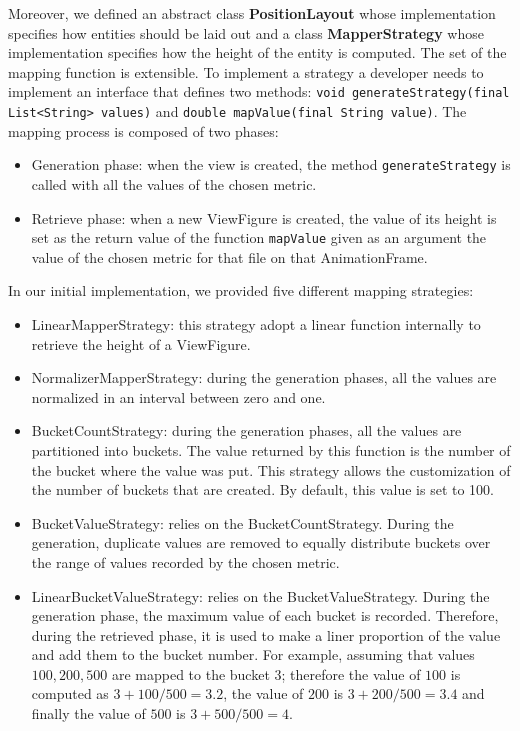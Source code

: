 Moreover, we defined an abstract class \textbf{PositionLayout} whose implementation specifies how entities should be laid out and a class \textbf{MapperStrategy} whose implementation specifies how the height of the entity is computed. The set of the mapping function is extensible. To implement a strategy a developer needs to implement an interface that defines two methods: \texttt{void generateStrategy(final List<String> values)} and \texttt{double mapValue(final String value)}. The mapping process is composed of two phases:
\begin{itemize}
    \item Generation phase: when the view is created, the method \texttt{generateStrategy} is called with all the values of the chosen metric. 
    \item Retrieve phase: when a new ViewFigure is created, the value of its height is set as the return value of the function \texttt{mapValue} given as an argument the value of the chosen metric for that file on that AnimationFrame. 
\end{itemize}

In our initial implementation, we provided five different mapping strategies:
\begin{itemize}
    \item LinearMapperStrategy: this strategy adopt a linear function internally to retrieve the height of a ViewFigure. 
    \item NormalizerMapperStrategy: during the generation phases, all the values are normalized in an interval between zero and one.

    \item BucketCountStrategy: during the generation phases, all the values are partitioned into buckets. The value returned by this function is the number of the bucket where the value was put. This strategy allows the customization of the number of buckets that are created. By default, this value is set to 100. 
    \item BucketValueStrategy: relies on the BucketCountStrategy. During the generation, duplicate values are removed to equally distribute buckets over the range of values recorded by the chosen metric. 

    \item LinearBucketValueStrategy: relies on the BucketValueStrategy. During the generation phase, the maximum value of each bucket is recorded. Therefore, during the retrieved phase, it is used to make a liner proportion of the value and add them to the bucket number. For example, assuming that values $100, 200, 500$ are mapped to the bucket $3$; therefore the value of $100$ is computed as $3 + 100/500 = 3.2$, the value of $200$ is $3 + 200/500 = 3.4$ and finally the value of $500$ is $3 + 500/500 = 4$.
\end{itemize}



